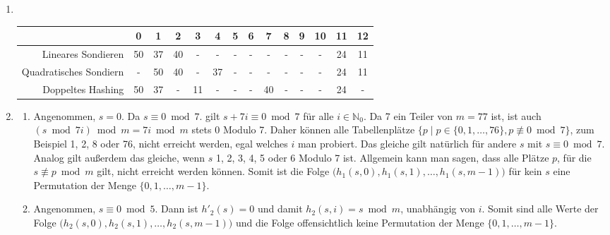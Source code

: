 \documentclass[11pt,a4paper]{article}
\begin{document}
\begin{loesung}
\begin{enumerate}
\begin{table}[h!]
\begin{tabular}{ccccccccccc}
            \end{tabular}
        \end{table}
        \FloatBarrier
        \item \ \\
        \begin{table}[h!]
            \centering
            \begin{tabular}{r|c|c|c|c|c|c|c|c|c|c|c|c|c|}
            \cline{2-14}
            & \textbf{0} & \textbf{1} & \textbf{2} & \textbf{3} & \textbf{4} & \textbf{5} & \textbf{6} & \textbf{7} & \textbf{8} & \textbf{9} & \textbf{10} & \textbf{11} & \textbf{12} \\ \hline
            \multicolumn{1}{|r|}{Lineares Sondieren} & 50 & 37 & 40 & - & - & - & - & - & - & - & - & 24 & 11 \\ \hline
            \multicolumn{1}{|r|}{Quadratisches Sondiern} & - & 50 & 40 & - & 37 & - & - & - & - & - & - & 24 & 11 \\ \hline
            \multicolumn{1}{|r|}{Doppeltes Hashing} & 50 & 37 & - & 11 & - & - & - & 40 & - & - & - & 24 & - \\ \hline
            \end{tabular}
        \end{table}
        \FloatBarrier
        \item 
        \begin{enumerate}[label=\roman*)]
            \item \label{addressing}Angenommen, $s = 0$. Da $s \equiv 0 \bmod 7$. gilt $s + 7i \equiv 0 \bmod{7}$ für alle $i \in \mathbb{N}_0$.
            Da 7 ein Teiler von $m = 77$ ist, ist auch $(s \bmod 7i) \bmod m = 7i \bmod m$ stets 0 Modulo 7. 
            Daher können alle Tabellenplätze $\{p \mid p \in \{0, 1, \ldots, 76\}, p \not\equiv 0 \bmod 7\}$, zum Beispiel 1, 2, 8 oder 76, nicht erreicht werden, egal welches $i$ man probiert.
            Das gleiche gilt natürlich für andere $s$ mit $s \equiv 0 \bmod 7$.
            Analog gilt außerdem das gleiche, wenn $s$ 1, 2, 3, 4, 5 oder 6 Modulo 7 ist.
            Allgemein kann man sagen, dass alle Plätze $p$, für die $s \not\equiv p \bmod m$ gilt, nicht erreicht werden können.
            Somit ist die Folge $\big(h_1(s, 0), h_1(s, 1), \ldots, h_1(s, m - 1)\big)$ für kein $s$ eine Permutation der Menge $\{0, 1, \ldots, m - 1\}$.

            \item Angenommen, $s \equiv 0 \bmod 5$.
            Dann ist $h'_2(s) = 0$ und damit $h_2(s, i) = s \bmod m$, unabhängig von $i$.
            Somit sind alle Werte der Folge $\big(h_2(s, 0), h_2(s, 1), \ldots, h_2(s, m - 1)\big)$ und die Folge offensichtlich keine Permutation der Menge $\{0, 1, \ldots, m - 1\}$.
            

\end{enumerate}
\end{enumerate}
\end{loesung}
\end{document}
